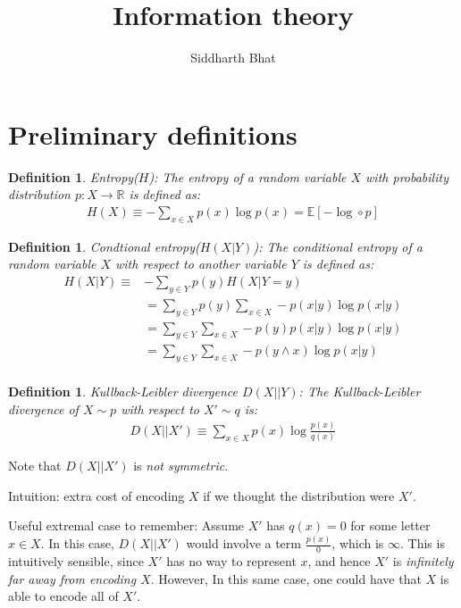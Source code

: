 \documentclass[11pt]{book}
\title{Information theory}
\author{Siddharth Bhat}
\date{}
\newtheorem{definition}[theorem]{Definition}
\renewcommand{\H}{\ensuremath{H}}
\newcommand{\E}{\ensuremath{\mathbb{E}}}
\newcommand{\R}{\ensuremath{\mathbb{R}}}
\newcommand{\KL}[2]{\ensuremath{D(#1 || #2)}}
\begin{document}
\maketitle
\tableofcontents

\section{Preliminary definitions}

\begin{definition}
    Entropy(\H): The entropy of a random variable $X$ with probability
    distribution $p: X \rightarrow \R $ is defined as:
    \begin{align*}
        \H(X) \equiv - \sum_{x \in X} p(x) \log p(x) = \E[- \log \circ p]
    \end{align*}
\end{definition}

\begin{definition}
    Condtional entropy($\H(X|Y)$): The conditional entropy of a random 
    variable $X$ with respect to another variable $Y$ is defined as:
    \begin{align*}
        \H(X|Y) \equiv &- \sum_{y \in Y} p(y) \H(X|Y=y) \\
                       &= \sum_{y \in Y} p(y) \sum_{x \in X} - p(x|y) \log p(x | y)\\
                       &= \sum_{y \in Y} \sum_{x \in X} - p(y) p(x|y) \log p(x | y)\\
                       &= \sum_{y \in Y} \sum_{x \in X} - p(y \land x) \log p(x | y)\\
    \end{align*}
\end{definition}

\begin{definition}
    Kullback-Leibler divergence \KL{X}{Y}: The Kullback-Leibler divergence
    of $X \sim p $ with respect to $X' \sim q$ is:
    \begin{align*}
        \KL{X}{X'} \equiv \sum_{x \in X} p(x) \log \frac{p(x)}{q(x)}
    \end{align*}
\end{definition}

Note that \KL{X}{X'} is \emph{not symmetric}.

Intuition: extra cost of encoding $X$ if we thought the distribution were $X'$.

Useful extremal case to remember: Assume $X'$ has $q(x) = 0$ for some
letter $x \in X$. In this case, $\KL{X}{X'}$ would involve a term $\frac{p(x)}{0}$,
which is $\infty$. This is intuitively sensible, since $X'$ has no way to represent
$x$, and hence $X'$ is \textit{infinitely far away from encoding $X$}. However,
In this same case, one could have that $X$ is able to encode all of $X'$.
\end{document}
